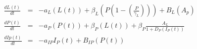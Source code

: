 \documentclass{article}
\begin{document}
\begin{eqnarray*}
  \frac{dL(t)}{dt} &=& -a_{L}(L(t)) + \beta_{L}(P(1-(\frac{P}{\gamma_{L}}))) + B_{L}(A_{p}) \\
  \frac{dP(t)}{dt} &=& -a_{P}(P(t)) + \beta_{P}(L(t)) + \beta_{P}\frac{A_{L}}{1+D_{P}(I_{P}(t))} \\
  \frac{dIp(t)}{dt} &=& -a_{IP}I_{P}(t) + B_{IP}(P(t))
\end{eqnarray*}
\end{document}
